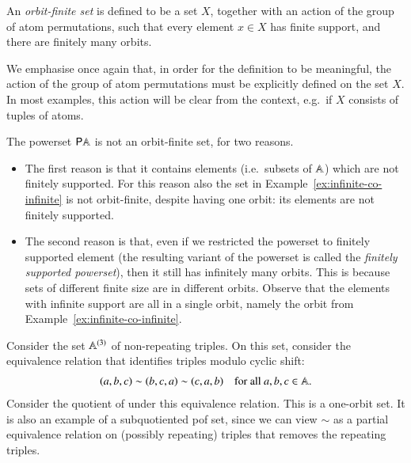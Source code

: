 \begin{definition}\label{def:orbit-finite-set-equality}
	An \emph{orbit-finite set} is defined to be a set $X$, together with an action of the group of atom permutations, such that every element $x \in X$ has finite support, and there are finitely many orbits. 
\end{definition}

We emphasise once again that, in order for the definition to be meaningful, the action of the group of atom permutations must be explicitly defined on the set $X$. In most examples, this action will be clear from the context, e.g.~if $X$ consists of tuples of atoms.


\begin{myexample}\label{ex:powerset-not-orbit-finite}
    The powerset ${\mathsf P} \mathbb A$ is  not an orbit-finite set, for two reasons.
    
    \begin{itemize}
        \item     The first reason is that it contains elements (i.e.~subsets of $\mathbb A$) which are not finitely supported. For this reason also the set in Example~\ref{ex:infinite-co-infinite} is not orbit-finite, despite having one orbit: its elements are not finitely supported. 
        \item       The second reason is that, even if we restricted the powerset to finitely supported element (the resulting variant of the powerset is called the \emph{finitely supported powerset}), then it still has infinitely many orbits. This is because sets of different finite size are in different orbits. Observe that the elements with infinite support are all in a single orbit, namely the orbit from Example~\ref{ex:infinite-co-infinite}. 
    \end{itemize}
\end{myexample}

\begin{myexample}\label{ex:cyclic-triples}
    Consider the set $\mathbb A^{(3)}$ of non-repeating triples. On this set, consider the equivalence relation that identifies triples modulo cyclic shift: 
    \begin{align*}
    (a,b,c) \sim (b,c,a) \sim (c,a,b) \quad \text{for all $a,b,c \in \mathbb A$}.
    \end{align*}
    Consider the quotient of under this equivalence relation. This is a one-orbit set. It is also an example of a subquotiented pof set, since we can view $\sim$ as a partial equivalence relation on (possibly repeating) triples that removes the repeating triples. 
\end{myexample}





